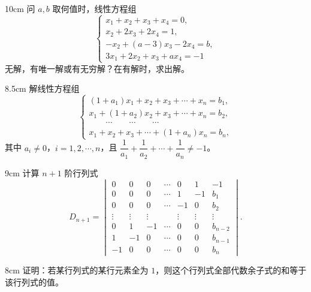 \begin{problem}{}{10cm}
问 $a,b$ 取何值时，线性方程组
\[
\begin{cases}
x_1+x_2+x_3+x_4=0,\\
x_2+2x_3+2x_4=1,\\
-x_2+(a-3)x_3-2x_4=b,\\
3x_1+2x_2+x_3+ax_4=-1
\end{cases}
\]
无解，有唯一解或有无穷解？在有解时，求出解。
\end{problem}

\begin{problem}{}{8.5cm}
解线性方程组
\[
\begin{cases}
(1+a_1)x_1+x_2+x_3+\cdots+x_n=b_1,\\
x_1+(1+a_2)x_2+x_3+\cdots+x_n=b_2,\\
\qquad\cdots\qquad\cdots\qquad\cdots\\
x_1+x_2+x_3+\cdots+(1+a_n)x_n=b_n,
\end{cases}
\]
其中 $a_i\ne 0$，$i=1,2,\cdots,n$，且 $\dfrac{1}{a_1}+\dfrac{1}{a_2}+\cdots+\dfrac{1}{a_n}\ne -1$。
\end{problem}

\begin{problem}{}{9cm}
计算 $n+1$ 阶行列式
\[
D_{n+1}=\begin{vmatrix}
0&0&0&\cdots&0&1&-1\\
0&0&0&\cdots&1&-1&b_1\\
0&0&0&\cdots&-1&0&b_2\\
\vdots&\vdots&\vdots&&\vdots&\vdots&\vdots\\
0&1&-1&\cdots&0&0&b_{n-2}\\
1&-1&0&\cdots&0&0&b_{n-1}\\
-1&0&0&\cdots&0&0&b_n
\end{vmatrix}.
\]
\end{problem}

\begin{problem}{}{8cm}
证明：若某行列式的某行元素全为 $1$，则这个行列式全部代数余子式的和等于该行列式的值。
\end{problem}

